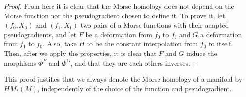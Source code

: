 \begin{proof}
From here it is clear that the Morse homology does not depend on the Morse function nor the pseudogradient chosen to define it. To prove it, let $(f_0,X_0)$ and $(f_1,X_1)$ two pairs of a Morse functions with their adapted pseudogradients, and let $F$ be a deformation from $f_0$ to $f_1$ and $G$ a deformation from $f_1$ to $f_0$. Also, take $H$ to be the constant interpolation from $f_0$ to itself. Then, after we apply the properties, it is clear that $F$ and $G$ induce the morphisms $\Phi^F$ and $\Phi^G$, and that they are each others inverses.
\end{proof}

\begin{rmrk}
This proof justifies that we always denote the Morse homology of a manifold by $HM_{\ast}(M)$, independently of the choice of the function and pseudogradient.
\end{rmrk}